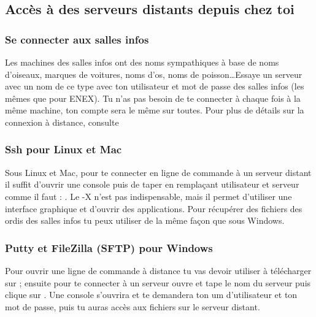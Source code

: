 \subsection{Accès à des serveurs distants depuis chez toi}

\subsubsection{Se connecter aux salles infos}

Les machines des salles infos ont des noms sympathiques à base de noms d'oiseaux, marques de voitures, noms d'os, noms de poisson\dots Essaye un serveur avec un nom de ce type avec ton utilisateur et mot de passe des salles infos (les mêmes que pour ENEX). Tu n'as pas besoin de te connecter à chaque fois à la même machine, ton compte sera le même sur toutes. Pour plus de détails sur la connexion à distance, consulte \newline {} 



\subsubsection{Ssh pour Linux et Mac}

Sous Linux et Mac, pour te connecter en ligne de commande à un serveur distant il suffit d'ouvrir une console puis de taper en remplaçant utilisateur et serveur comme il faut : . Le -X n'est pas indispensable, mais il permet d'utiliser une interface graphique et d'ouvrir des applications. Pour récupérer des fichiers des ordis des salles infos tu peux utiliser  de la même façon que sous Windows.

\subsubsection{Putty et FileZilla (SFTP) pour Windows}

Pour ouvrir une ligne de commande à distance tu vas devoir utiliser  à télécharger sur  ;
ensuite pour te connecter à un serveur ouvre  et tape le nom du serveur puis clique sur .
Une console s'ouvrira et te demandera ton um d'utilisateur et ton mot de passe, puis tu auras accès aux fichiers sur le serveur distant.


